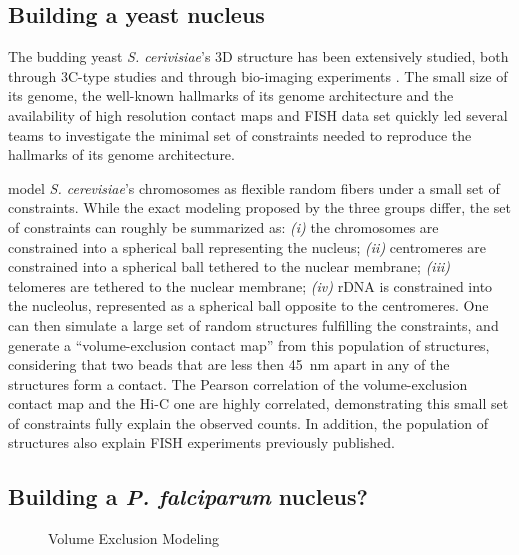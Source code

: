 \documentclass[2columns]{article}
\begin{document}
\subsection*{Building a yeast nucleus}

The budding yeast \textit{S. cerivisiae}'s 3D structure has been extensively
studied, both through 3C-type studies \citep{dekker:capturing,
duan:three-dimensional, burton:species-level} and through bio-imaging experiments
\citep{berger:high}. The small size of its genome, the well-known hallmarks of its
genome architecture and the availability of high resolution contact maps and
FISH data set quickly led several teams to investigate the minimal set of
constraints needed to reproduce the hallmarks of its genome architecture.

\cite{tjong:physical, tokuda:dynamical, tjong:physical} model {\em S.
cerevisiae}'s chromosomes as flexible random fibers under a small set of
constraints. While the exact modeling proposed by the three groups differ, the
set of constraints can roughly be summarized as: \textit{(i)} the chromosomes
are constrained into a spherical ball representing the nucleus; \textit{(ii)}
centromeres are constrained into a spherical ball tethered to the nuclear
membrane; \textit{(iii)} telomeres are tethered to the nuclear membrane;
\textit{(iv)} rDNA is constrained into the nucleolus, represented as a
spherical ball opposite to the centromeres. One can then simulate a large set
of random structures fulfilling the constraints, and generate a
``volume-exclusion contact map'' from this population of structures,
considering that two beads that are less then 45~nm apart in any of the
structures form a contact. The Pearson correlation of the volume-exclusion
contact map and the Hi-C one are highly correlated, demonstrating this small
set of constraints fully explain the observed counts. In addition, the
population of structures also explain FISH experiments previously published.

\subsection*{Building a {\em P. falciparum} nucleus?}

\begin{figure}
\caption{Volume Exclusion Modeling}{}
\label{fig:ve_modeling}
\end{figure}
\end{document}
